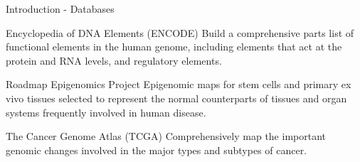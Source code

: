 \documentclass[slidestop,compress,11pt,xcolor=dvipsnames]{beamer}
\begin{document}
\begin{frame}{Introduction - Databases}
\begin{block}{Encyclopedia of DNA Elements (ENCODE)}
Build a comprehensive parts list of functional elements in the human genome, including elements that act at the protein and RNA levels, and regulatory elements.
\end{block}

\begin{exampleblock}{Roadmap Epigenomics Project}
Epigenomic maps for stem cells and primary ex vivo tissues selected to represent the normal counterparts of tissues and organ systems frequently involved in human disease.
\end{exampleblock}

\begin{alertblock}{The Cancer Genome Atlas  (TCGA)}
Comprehensively map the important genomic changes involved in the major types and subtypes of cancer.
\end{alertblock}

\end{frame}


\end{document}
